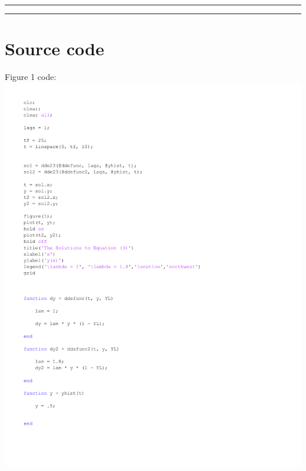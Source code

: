 \documentclass{article}
\begin{document}
\bigskip
\hrule\hrule
\medskip

\section{Source code}

\begin{center}
    \LARGE Figure 1 code:
    \includegraphics[width=15cm]{Figure_1.pdf}
\end{center}
\newpage
\end{document}
